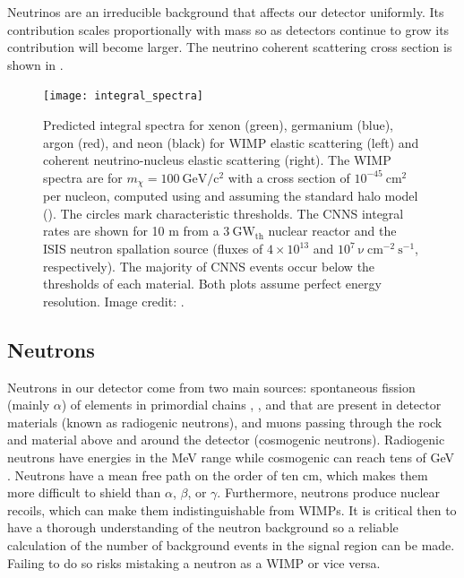 Neutrinos are an irreducible background that affects our detector uniformly.  Its contribution scales proportionally with mass so as
detectors continue to grow its contribution will become larger.  The neutrino coherent scattering cross section is shown in
.

\begin{figure}
\centering
\texttt{[image: integral\_spectra]}
\caption[Predicted integral spectra for xenon, germanium, argon, and neon for WIMP elastic scattering
and CNNS.  The WIMP spectra are for $m_{\chi} = 100\ \mathrm{GeV/c^2}$ with a
cross section of $10^{-45}\ \mathrm{cm^2}$ per nucleon.  The CNNS integral rates are shown for 10 m from a $3\ \mathrm{GW_{th}}$ nuclear
reactor and the ISIS neutron spallation source.]{Predicted integral spectra for xenon (green), germanium (blue), argon (red), and
neon (black) for WIMP elastic scattering (left)
and coherent neutrino-nucleus elastic scattering (right).  The WIMP spectra are for $m_{\chi} = 100\ \mathrm{GeV/c^2}$ with a
cross section of $10^{-45}\ \mathrm{cm^2}$ per nucleon, computed using  and assuming the standard halo model
().  The circles mark
characteristic thresholds.  The CNNS integral rates are shown for 10 m from a $3\ \mathrm{GW_{th}}$ nuclear
reactor and the ISIS neutron spallation source  (fluxes of
$4 \times 10^{13}$ and $10^{7}\ \mathrm{\nu\ cm^{-2}\ s^{-1}}$, respectively).  The majority of CNNS events occur below the
thresholds of each material.  Both plots assume perfect energy resolution.  Image credit:
.}
\label{fig:neutrinos_integral_spectra}
\end{figure}


\subsection{Neutrons}
\label{subsec:neutrons}
Neutrons in our detector come from two main sources: spontaneous fission (mainly $\alpha$) of elements in primordial chains
\uranium, , and  that are present in detector materials (known as radiogenic neutrons), and muons
passing through the rock and material above and around the detector (cosmogenic neutrons).  Radiogenic neutrons have energies in the MeV
range
while cosmogenic can reach tens of GeV .  Neutrons have a mean free path on the order of ten cm, which makes
them more difficult to shield than $\alpha$, $\beta$, or $\gamma$.  Furthermore, neutrons produce nuclear recoils, which can make
them indistinguishable from WIMPs.  It is critical then to have a thorough understanding of the neutron background so a reliable
calculation of the number of background events in the signal region can be made.  Failing to do so risks mistaking a neutron as a WIMP or
vice versa.

